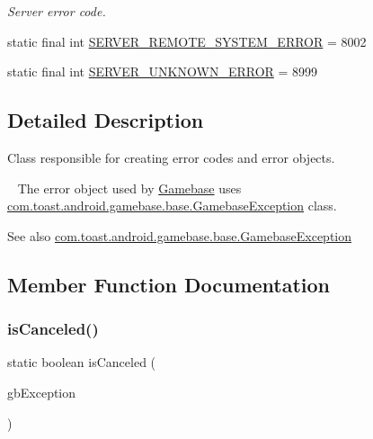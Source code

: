 \begin{DoxyCompactItemize}
\begin{DoxyCompactList}\small\item\em Server error code. \end{DoxyCompactList}\item 
static final int \hyperlink{classcom_1_1toast_1_1android_1_1gamebase_1_1base_1_1_gamebase_error_acc3672296c208fd1bea93617c2f7ddeb}{S\+E\+R\+V\+E\+R\+\_\+\+R\+E\+M\+O\+T\+E\+\_\+\+S\+Y\+S\+T\+E\+M\+\_\+\+E\+R\+R\+OR} = 8002
\item 
static final int \hyperlink{classcom_1_1toast_1_1android_1_1gamebase_1_1base_1_1_gamebase_error_ad6e53269e4ff5378bdc18dc5e2e621f8}{S\+E\+R\+V\+E\+R\+\_\+\+U\+N\+K\+N\+O\+W\+N\+\_\+\+E\+R\+R\+OR} = 8999
\end{DoxyCompactItemize}


\subsection{Detailed Description}
Class responsible for creating error codes and error objects. 

~\newline
 The error object used by \hyperlink{classcom_1_1toast_1_1android_1_1gamebase_1_1_gamebase}{Gamebase} uses \hyperlink{classcom_1_1toast_1_1android_1_1gamebase_1_1base_1_1_gamebase_exception}{com.\+toast.\+android.\+gamebase.\+base.\+Gamebase\+Exception} class.

\begin{DoxySeeAlso}{See also}
\hyperlink{classcom_1_1toast_1_1android_1_1gamebase_1_1base_1_1_gamebase_exception}{com.\+toast.\+android.\+gamebase.\+base.\+Gamebase\+Exception} 
\end{DoxySeeAlso}


\subsection{Member Function Documentation}
\mbox{\label{classcom_1_1toast_1_1android_1_1gamebase_1_1base_1_1_gamebase_error_a19d8ad6593536a494dbf1fbae403779d}} 
\subsubsection{\texorpdfstring{is\+Canceled()}{isCanceled()}}
{\footnotesize\ttfamily static boolean is\+Canceled (\begin{DoxyParamCaption}\item[{@Nullable final \hyperlink{classcom_1_1toast_1_1android_1_1gamebase_1_1base_1_1_gamebase_exception}{Gamebase\+Exception}}]{gb\+Exception }\end{DoxyParamCaption})\hspace{0.3cm}{\ttfamily [static]}}

